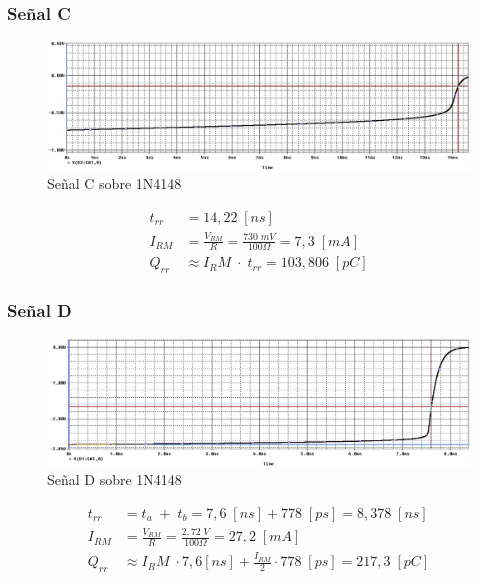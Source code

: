 \documentclass{article}
\begin{document}
\subsubsection{Señal C}
\begin{figure}[h!]
 \begin{center}
	\includegraphics[width=\textwidth]{imagenes/1N4148_C.jpg} 
	\caption{Señal C sobre 1N4148}
 \end{center}
\end{figure}
\begin{align*}
	t_{rr} &= 14,22 \; [ns] \\
	I_{RM}	&= \frac{V_{RM}}{R} = \frac{730 \; mV}{100 \Omega} = 7,3 \; [mA] \\
	Q_{rr}	&\approx {I_RM} \; \cdot \; t_{rr} = 103,806 \; [pC]
\end{align*}
%

\clearpage
\subsubsection{Señal D}
\begin{figure}[h!]
 \begin{center}
	\includegraphics[width=\textwidth]{imagenes/1N4148_D.jpg} 
	\caption{Señal D sobre 1N4148}
 \end{center}
\end{figure}
\begin{align*}
	t_{rr} &= t_a \;+\; t_b = 7,6 \; [ns] + 778 \; [ps] = 8,378 \; [ns] \\
	I_{RM}	&= \frac{V_{RM}}{R} = \frac{2,72 \; V}{100 \Omega} = 27,2 \; [mA] \\
	Q_{rr}	&\approx {I_RM} \; \cdot 7,6 [ns] + \frac{I_{RM}}{2} \cdot 778 \; [ps] = 217,3 \; [pC]
\end{align*}
\end{document}
